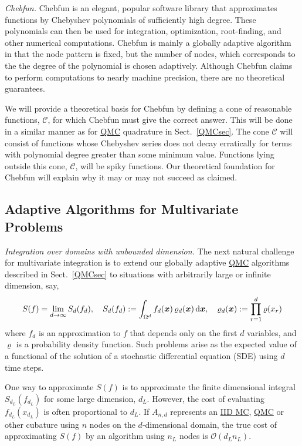 \documentclass[11pt]{NSFamsart}
\newcommand{\QMC}{\hyperlink{QMClink}{QMC}\xspace}
\newcommand{\IIDMC}{\hyperlink{IIDMClink}{IID MC}\xspace}
\newcommand{\bx}{{\boldsymbol{x}}}
\def\dif{\textup{d}}
\newcommand{\cc}{\mathcal{C}}
\newcommand{\Order}{\mathcal{O}}
\begin{document}
\emph{Chebfun.}
Chebfun \cite{TrefEtal17a} is an elegant, popular software library that approximates functions by 
Chebyshev polynomials of 
sufficiently high degree.  These polynomials can then be used for integration, optimization, 
root-finding, and other numerical computations.  Chebfun is mainly a globally adaptive algorithm in 
that the node pattern is fixed, but the number of nodes, which corresponds to 
the the degree of the polynomial is chosen adaptively.  Although Chebfun claims to perform 
computations 
to nearly machine precision, there are no theoretical guarantees.  

We will provide a theoretical basis for Chebfun by defining a cone of reasonable functions, 
$\cc$, for which Chebfun must give the correct answer.  This will be done in a similar manner as for 
\QMC quadrature in Sect.\ \ref{QMCsec}.  The cone $\cc$ will consist of functions 
whose Chebyshev series does not decay erratically for terms with polynomial degree greater than 
some minimum value.  Functions lying outside this cone, $\cc$, will be spiky functions.   Our 
theoretical foundation for Chebfun will explain why it may or may not succeed as claimed.

\subsection{Adaptive Algorithms for Multivariate Problems}\label{SectMultiProb}

\emph{Integration over domains with unbounded dimension.} The next natural challenge for 
multivariate integration is to extend our 
globally adaptive \QMC algorithms described in Sect.\ \ref{QMCsec} to situations with arbitrarily 
large 
or infinite dimension, say,
\[
S(f) = \lim_{d \to \infty} S_d(f_d), \quad S_d(f_d):= \int_{\Omega^d} f_d(\bx) \, \varrho_d(\bx) \, \dif 
\bx, \quad \varrho_d(\bx) : = \prod_{r=1}^{d} \varrho(x_r)
\]
where $f_d$ is an  approximation to $f$ that depends only on the first $d$ variables, and $\varrho$ 
is a probability density function.  Such 
problems arise as the expected value of a functional of the solution of a 
stochastic differential equation (SDE) using $d$ time steps.  

One way to approximate $S(f)$ is to approximate the finite 
dimensional integral $S_{d_L}(f_{d_L})$ for some large dimension, $d_L$.  However, the cost of 
evaluating $f_{d_L}(x_{d_L})$ is often proportional to $d_L$.  If $A_{n,d}$ represents an \IIDMC, 
\QMC or other cubature 
using $n$ nodes on the $d$-dimensional domain,  the true cost of approximating $S(f)$ by an 
algorithm using 
$n_L$ nodes is
$\Order(d_L n_L)$.
\end{document}
